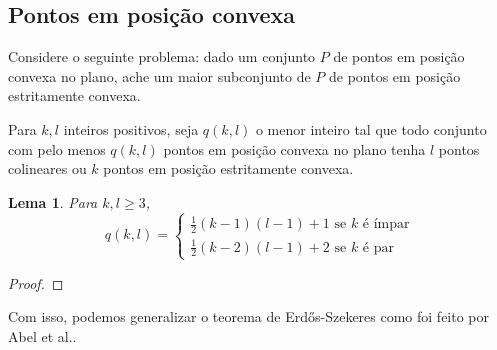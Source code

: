 \documentclass[a4paper]{book}
\newtheorem{lema}{Lema}
\begin{document}
\subsection{Pontos em posição convexa}
Considere o seguinte problema: dado um conjunto $P$ de pontos em posição convexa no plano, ache um maior subconjunto de $P$ de pontos em posição estritamente convexa.

Para $k,l$ inteiros positivos, seja $q(k,l)$ o menor inteiro tal que todo conjunto com pelo menos $q(k,l)$ pontos em posição convexa no plano tenha $l$ pontos colineares ou $k$ pontos em posição estritamente convexa.

\begin{lema}\label{convex}
    Para $k,l\geq 3$, 
    $$q(k,l)=
    \begin{cases}
        \frac{1}{2}(k-1)(l-1)+1 \text{ se }k\text{ é ímpar}\\
    \frac{1}{2}(k-2)(l-1)+2  \text{ se }k\text{ é par}
    \end{cases}$$
\end{lema}
\begin{proof}

\end{proof}

Com isso, podemos generalizar o teorema de Erd\H os-Szekeres como foi feito por Abel et al.\cite{pentagon}.
\end{document}
